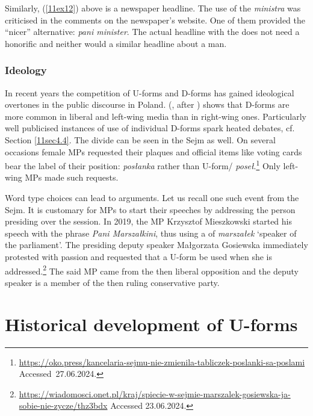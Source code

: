 \documentclass[output=paper,colorlinks,citecolor=brown]{langscibook}
\begin{document}
Similarly, (\ref{11ex12}) above is a newspaper headline. The use of the  \emph{ministra} was criticised in the comments on the newspaper's website. One of them provided the ``nicer'' alternative: \emph{pani minister}. The actual headline with the  does not need a honorific and neither would a similar headline about a man.

\subsubsection{Ideology} \label{11sec3.3.5}

{\sloppy In recent years the competition of U-forms and D-forms has gained ideological overtones in the public discourse in Poland. \citeauthor{stepien2018} (\citeyear{stepien2018}, after \citealt[158]{szpyra-kozlowska2021}) shows that D-forms are more common in liberal and left-wing media than in right-wing ones. Particularly well publicised instances of use of individual D-forms spark heated debates, cf. Section \ref{11sec4.4}. The divide can be seen in the Sejm as well. On several occasions female MPs requested their plaques and official items like voting cards bear the  label of their position: \emph{posłanka} rather than U-form/ \emph{poseł}.\footnote{\url{https://oko.press/kancelaria-sejmu-nie-zmienila-tabliczek-poslanki-sa-poslami} \mbox{Accessed 27.06.2024.}\label{11ftn26}} Only left-wing MPs made such requests.\par}

Word type choices can lead to arguments. Let us recall one such event from the Sejm. It is customary for MPs to start their speeches by addressing the person presiding over the session. In 2019, the MP Krzysztof Mieszkowski started his speech with the phrase \emph{Pani Marszałkini}, thus using a  of \emph{marszałek} `speaker of the parliament'. The presiding deputy speaker Małgorzata Gosiewska immediately protested with passion and requested that a U-form be used when she is addressed.\footnote{\url{https://wiadomosci.onet.pl/kraj/spiecie-w-sejmie-marszalek-gosiewska-ja-sobie-nie-zycze/thz3bdx} Accessed 23.06.2024.} The said MP came from the then liberal opposition and the deputy speaker is a member of the then ruling conservative party.

\section{Historical development of U-forms} \label{11sec4}
\end{document}
